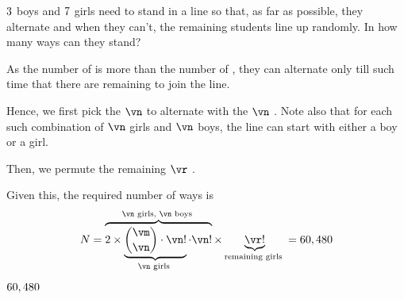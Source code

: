 





\question[2] $3$ boys and $7$ girls need to stand in a line so that, as far as possible, they alternate 
and when they can't, the remaining students line up randomly. In how many ways can they stand?

\watchout

\begin{solution}[\mcq]
  As the number of \vc is more than the number of \vd, they can alternate only till such time 
  that there are \vd remaining to join the line. 
	
  Hence, we first pick the $\vn$ \vc to alternate with the $\vn$ \vd. Note also that 
  for each such combination of $\vn$ girls and $\vn$ boys, the line can start with either a 
  boy or a girl. 
  
  Then, we permute the remaining $\vr$ \vc.
  
  Given this, the required number of ways is 
  \[ N = \overbrace{2\times\underbrace{\binom\vm\vn\cdot\vn !}_{\vn\text{ \vc }}\cdot\vn !}^{\vn\text{ girls, }\vn\text{ boys }}
  \times\underbrace{\vr !}_{\text{remaining \vc}} = \ve \]

\end{solution}

\ifprintanswers
  \begin{codex}
    $60,480$
  \end{codex}
\fi
